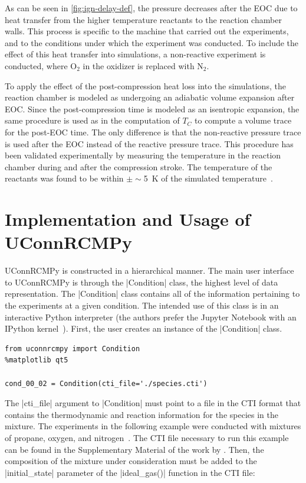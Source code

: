 \documentclass[12pt]{../ussci}
\begin{document}
As can be seen in \cref{fig:ign-delay-def}, the pressure
decreases after the EOC due to heat transfer from the higher temperature
reactants to the reaction chamber walls. This process is specific to the
machine that carried out the experiments, and to the conditions under
which the experiment was conducted. To include the effect of this heat
transfer into simulations, a non-reactive experiment is conducted, where
\(\text{O}_2\) in the oxidizer is replaced with \(\text{N}_2\).

To apply the effect of the post-compression heat loss into the simulations, the
reaction chamber is modeled as undergoing an adiabatic volume expansion after
EOC. Since the post-compression time is modeled as an isentropic expansion, the
same procedure is used as in the computation of \(T_C\) to compute a volume
trace for the post-EOC time. The only difference is that the non-reactive
pressure trace is used after the EOC instead of the reactive pressure trace.
This procedure has been validated experimentally by measuring the temperature in
the reaction chamber during and after the compression stroke. The temperature of
the reactants was found to be within $\pm\sim $\SI{5}{\K} of the simulated
temperature~\autocite{Das2012a,Uddi2012}.

\section{Implementation and Usage of UConnRCMPy}\label{implementation-and-usage-of-uconnrcmpy}

UConnRCMPy is constructed in a hierarchical manner. The main user interface to
UConnRCMPy is through the \python|Condition| class, the highest level of data
representation. The \python|Condition| class contains all of the information
pertaining to the experiments at a given condition. The intended use of this
class is in an interactive Python interpreter (the authors prefer the Jupyter
Notebook with an IPython kernel~\autocite{Perez2007}). First, the user creates
an instance of the \python|Condition| class.

\begin{verbatim}
from uconnrcmpy import Condition
%matplotlib qt5

cond_00_02 = Condition(cti_file='./species.cti')
\end{verbatim}

The \python|cti_file| argument to \python|Condition| must point to a file in the
CTI format that contains the thermodynamic and reaction information for the
species in the mixture. The experiments in the following example were conducted
with mixtures of propane, oxygen, and nitrogen~\autocite{Dames2016}. The CTI
file necessary to run this example can be found in the Supplementary Material of
the work by \textcite{Dames2016}. Then, the composition of the mixture under
consideration must be added to the \python|initial_state| parameter of the
\python|ideal_gas()| function in the CTI file:
\end{document}
